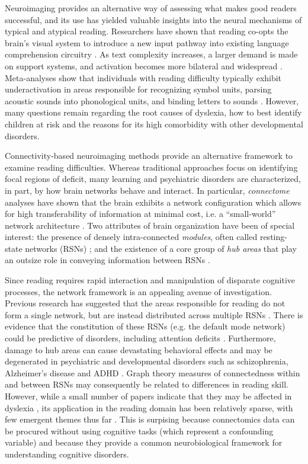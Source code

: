 Neuroimaging provides an alternative way of assessing what makes good readers successful, and its use has yielded valuable insights into the neural mechanisms of typical and atypical reading. Researchers have shown that reading co-opts the brain's visual system to introduce a new input pathway into existing language comprehension circuitry \citep{Jobard2007}. As text complexity increases, a larger demand is made on support systems, and activation becomes more bilateral and widespread \citep{Xu2005}.  Meta-analyses show that individuals with reading difficulty typically exhibit underactivation in areas responsible for recognizing symbol units, parsing acoustic sounds into phonological units, and binding letters to sounds \citep{Maisog2008, Richlan2009, Paulesu2014}. However, many questions remain regarding the root causes of dyslexia, how to best identify children at risk and the reasons for its high comorbidity with other developmental disorders. 

Connectivity-based neuroimaging methods provide an alternative framework to examine reading difficulties. Whereas traditional approaches focus on identifying focal regions of deficit, many learning and psychiatric disorders are characterized, in part, by how brain networks behave and interact. In particular, \textit{connectome} analyses have shown that the brain exhibits a network configuration which allows for high transferability of information at minimal cost, i.e. a ``small-world'' network architecture \citep{Bullmore2012}. Two attributes of brain organization have been of special interest: the presence of densely intra-connected \textit{modules}, often called resting-state networks (RSNs) \citep{Sporns2016}; and the existence of a core group of \textit{hub areas} that play an outsize role in conveying information between RSNs \citep{VandenHeuvel2011}. 

Since reading requires rapid interaction and manipulation of disparate cognitive processes, the network framework is an appealing avenue of investigation. Previous research has suggested that the areas responsible for reading do not form a single network, but are instead distributed across multiple RSNs \citep{Vogel2013}. There is evidence that the constitution of these RSNs (e.g. the default mode network) could be predictive of disorders, including attention deficits \citep{Uddin2008}. Furthermore, damage to hub areas can cause devastating behavioral effects \citep{Warren2014} and may be degenerated in psychiatric and developmental disorders such as schizophrenia, Alzheimer's disease and ADHD \citep{Stam2014}. Graph theory measures of connectedness within and between RSNs may consequently be related to differences in reading skill. However, while a small number of papers indicate that they may be affected in dyslexia \citep{Qi2016, Finn2014}, its application in the reading domain has been relatively sparse, with few emergent themes thus far \citep{Cao2016}. This is surpising because connectomics data can be procured without using cognitive tasks (which represent a confounding variable) and because they provide a common neurobiological framework for understanding cognitive disorders.

